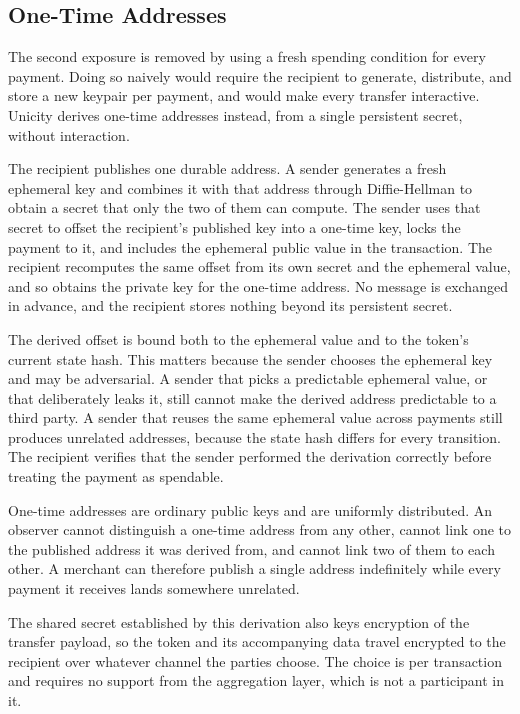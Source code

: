\subsection{One-Time Addresses}

The second exposure is removed by using a fresh spending condition for every payment. Doing so naively would require the recipient to generate, distribute, and store a new keypair per payment, and would make every transfer interactive. Unicity derives one-time addresses instead, from a single persistent secret, without interaction.

The recipient publishes one durable address. A sender generates a fresh ephemeral key and combines it with that address through Diffie-Hellman to obtain a secret that only the two of them can compute. The sender uses that secret to offset the recipient's published key into a one-time key, locks the payment to it, and includes the ephemeral public value in the transaction. The recipient recomputes the same offset from its own secret and the ephemeral value, and so obtains the private key for the one-time address. No message is exchanged in advance, and the recipient stores nothing beyond its persistent secret.

The derived offset is bound both to the ephemeral value and to the token's current state hash. This matters because the sender chooses the ephemeral key and may be adversarial. A sender that picks a predictable ephemeral value, or that deliberately leaks it, still cannot make the derived address predictable to a third party. A sender that reuses the same ephemeral value across payments still produces unrelated addresses, because the state hash differs for every transition. The recipient verifies that the sender performed the derivation correctly before treating the payment as spendable.

One-time addresses are ordinary public keys and are uniformly distributed. An observer cannot distinguish a one-time address from any other, cannot link one to the published address it was derived from, and cannot link two of them to each other. A merchant can therefore publish a single address indefinitely while every payment it receives lands somewhere unrelated.

The shared secret established by this derivation also keys encryption of the transfer payload, so the token and its accompanying data travel encrypted to the recipient over whatever channel the parties choose. The choice is per transaction and requires no support from the aggregation layer, which is not a participant in it.

